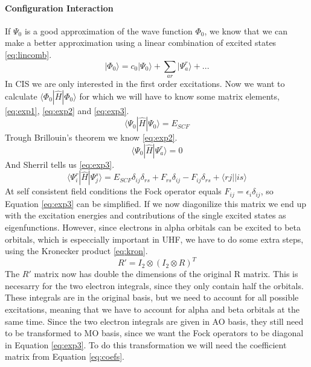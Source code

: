 \paragraph{Configuration Interaction}
If $\Psi_0$ is a good approximation of the wave function $\Phi_0$, we know that we can make a better approximation using a linear combination of excited states \eqref{eq:lincomb}.
\begin{equation}\label{eq:lincomb}
    |\Phi_0\rangle = c_0|\Psi_0\rangle + \sum_{ar}|\Psi_a^r\rangle + ...
\end{equation}
In CIS we are only interested in the first order excitations. Now we want to calculate $\langle\Phi_0|\hat{H}|\Phi_0\rangle$ for which we will have to know some matrix elements, \eqref{eq:exp1}, \eqref{eq:exp2} and \eqref{eq:exp3}.
\begin{equation}\label{eq:exp1}
    \langle\Psi_0|\hat{H}|\Psi_0\rangle = E_{SCF}
\end{equation}
Trough Brillouin's theorem we know \eqref{eq:exp2}.
\begin{equation}\label{eq:exp2}
    \langle\Psi_0|\hat{H}|\Psi_a^r\rangle = 0
\end{equation}
And Sherril tells us \eqref{eq:exp3}.
\begin{equation}\label{eq:exp3}
    \langle\Psi_i^r|\hat{H}|\Psi_j^s\rangle = E_{SCF}\delta_{ij}\delta_{rs} + F_{rs}\delta_{ij} - F_{ij}\delta_{rs} + \langle rj||is\rangle
\end{equation}
At self consistent field conditions the Fock operator equals $F_{ij} = \epsilon_i\delta_{ij}$, so Equation \eqref{eq:exp3} can be simplified. If we now diagonilize this matrix we end up with the excitation energies and contributions of the single excited states as eigenfunctions. However, since electrons in alpha orbitals can be excited to beta orbitals, which is especcially important in UHF, we have to do some extra steps, using the Kronecker product \eqref{eq:kron}.
\begin{equation}\label{eq:kron}
    R' = I_2 \otimes (I_2 \otimes R)^T
\end{equation}
The $R'$ matrix now has double the dimensions of the original R matrix. This is necesarry for the two electron integrals, since they only contain half the orbitals. These integrals are in the original basis, but we need to account for all possible excitations, meaning that we have to account for alpha and beta orbitals at the same time. Since the two electron integrals are given in AO basis, they still need to be transformed to MO basis, since we want the Fock operators to be diagonal in Equation \eqref{eq:exp3}. To do this transformation we will need the coefficient matrix from Equation \eqref{eq:coefs}.
